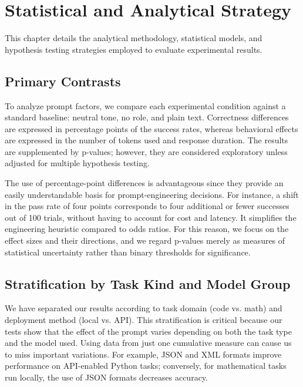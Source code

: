 \chapter{Statistical and Analytical Strategy\label{cha:chapter4}}

This chapter details the analytical methodology, statistical models, and hypothesis testing strategies employed to evaluate experimental results.

\section{Primary Contrasts\label{sec:primary-contrasts}}

To analyze prompt factors, we compare each experimental condition against a standard baseline: neutral tone, no role, and plain text. Correctness differences are expressed in percentage points of the success rates, whereas behavioral effects are expressed in the number of tokens used and response duration. The results are supplemented by p-values; however, they are considered exploratory unless adjusted for multiple hypothesis testing.

The use of percentage-point differences is advantageous since they provide an easily understandable basis for prompt-engineering decisions. For instance, a shift in the pass rate of four points corresponds to four additional or fewer successes out of 100 trials, without having to account for cost and latency. It simplifies the engineering heuristic compared to odds ratios. For this reason, we focus on the effect sizes and their directions, and we regard p-values merely as measures of statistical uncertainty rather than binary thresholds for significance.

\section{Stratification by Task Kind and Model Group}

We have separated our results according to task domain (code vs. math) and deployment method (local vs. API). This stratification is critical because our tests show that the effect of the prompt varies depending on both the task type and the model used. Using data from just one cumulative measure can cause us to miss important variations. For example, JSON and XML formats improve performance on API-enabled Python tasks; conversely, for mathematical tasks run locally, the use of JSON formats decreases accuracy.

